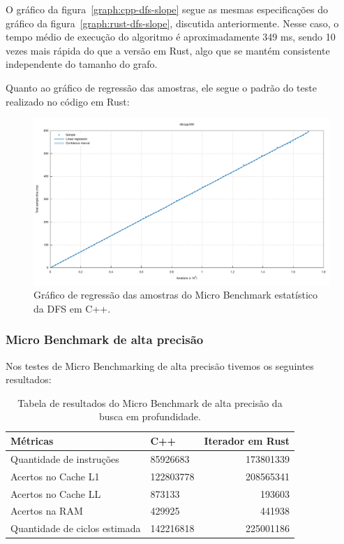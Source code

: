 O gráfico da figura~\ref{graph:cpp-dfs-slope} segue as mesmas
especificações do gráfico da figura~\ref{graph:rust-dfs-slope},
discutida anteriormente. Nesse caso, o tempo médio de execução do
algoritmo é aproximadamente 349 ms, sendo 10 vezes mais rápida do que
a versão em Rust, algo que se mantém consistente independente do
tamanho do grafo.

Quanto ao gráfico de regressão das amostras, ele segue o padrão do
teste realizado no código em Rust:

\begin{figure}[!ht]
  \centering
  \caption{Gráfico de regressão das amostras do Micro Benchmark
  estatístico da DFS em C++.}
  \includegraphics[width=\textwidth]{figures/cpp-dfs-500-regression.pdf}
\end{figure}
\FloatBarrier

\subsubsection{Micro Benchmark de alta precisão}

Nos testes de Micro Benchmarking de alta precisão tivemos os
seguintes resultados:

\begin{table}[!ht]
  \centering
  \caption{Tabela de resultados do Micro Benchmark de alta precisão
  da busca em profundidade.}
  \begin{tabular}{llr}
    \toprule
    Métricas                 &  C++    & Iterador em Rust \\
    \midrule
    Quantidade de instruções      & 85926683  & 173801339 \\
    Acertos no Cache L1           & 122803778 & 208565341 \\
    Acertos no Cache LL           & 873133    & 193603    \\
    Acertos na RAM                & 429925    & 441938    \\
    Quantidade de ciclos estimada & 142216818 & 225001186 \\
    \bottomrule
  \end{tabular}
  \label{tab:microhp-dfs}
\end{table}
\FloatBarrier

